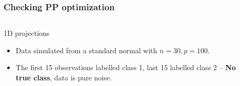 \documentclass{beamer}
\begin{document}
\begin{frame}
  \frametitle{Checking PP optimization}
	\begin{columns}
		\begin{column}{0.4\textwidth}{1D projections}
		  \begin{itemize}
			  \item Data simulated from a standard normal with $n=30, p=100$.
			  \item The first 15 observations labelled class 1, last 15 labelled class 2
			 -- {\bf No true class}, data is pure noise.
		  \end{itemize}		
			
		\end{column}
		
		\begin{column}{0.6\textwidth}
			 \begin{center}  \end{center}
		\end{column}
	\end{columns}  
\end{frame} 
\end{document}
